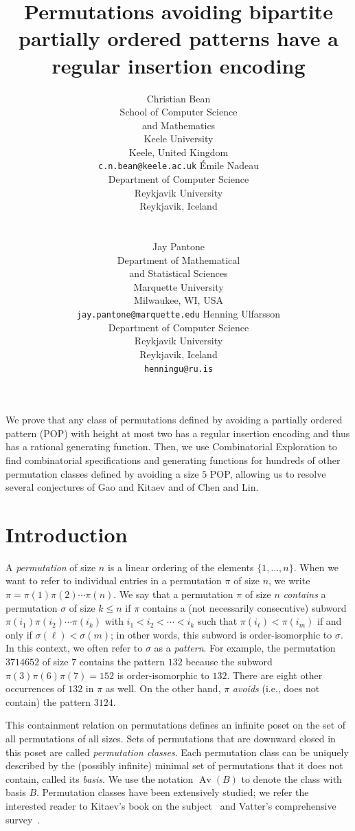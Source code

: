 \documentclass[11pt]{article}
\title{Permutations avoiding bipartite partially ordered patterns have a regular insertion encoding}
\author{
	\begin{tabular}{m{2.5in}m{2.5in}}
		\makecell{
			Christian Bean\\
			\small School of Computer Science\\
			\small and Mathematics\\
			\small Keele University\\
			\small Keele, United Kingdom\\
			\small \texttt{c.n.bean@keele.ac.uk}
		}&
		\makecell{
			\'Emile Nadeau\\
			\small Department of Computer Science\\
			\small Reykjavik University\\
			\small Reykjavik, Iceland\\
		}\\&\\
		\makecell{
			Jay Pantone\\
			\small Department of Mathematical\\
			\small and Statistical Sciences\\
			\small Marquette University\\
			\small Milwaukee, WI, USA\\
			\small \texttt{jay.pantone@marquette.edu}
		}
		&
		\makecell{
			Henning Ulfarsson\\
			\small Department of Computer Science\\
			\small Reykjavik University\\
			\small Reykjavik, Iceland\\
			\small \texttt{henningu@ru.is}
		}
	\end{tabular}
}
\date{}
\theoremstyle{definition}
\numberwithin{theorem}{section}
\numberwithin{question}{section}
\numberwithin{definition}{section}
\numberwithin{example}{section}
\numberwithin{remark}{section}
\newcommand{\Av}{\operatorname{Av}}
\renewenvironment{abstract}{
	\begin{list}{}%
	{\setlength{\rightmargin}{1in}%
	\setlength{\leftmargin}{1in}}%
	\item[]\ignorespaces\begin{small}}%
	{\end{small}\unskip\end{list}%
}
\begin{document}
\maketitle

\begin{abstract}
	We prove that any class of permutations defined by avoiding a partially ordered pattern (POP) with height at most two has a regular insertion encoding and thus has a rational generating function. Then, we use Combinatorial Exploration to find combinatorial specifications and generating functions for hundreds of other permutation classes defined by avoiding a size $5$ POP, allowing us to resolve several conjectures of Gao and Kitaev and of Chen and Lin.
\end{abstract}




\section{Introduction}

A \emph{permutation} of size $n$ is a linear ordering of the elements $\{1, \ldots, n\}$. When we want to refer to individual entries in a permutation $\pi$ of size $n$, we write $\pi = \pi(1)\pi(2)\cdots\pi(n)$. We say that a permutation $\pi$ of size $n$ \emph{contains} a permutation $\sigma$ of size $k \leq n$ if $\pi$ contains a (not necessarily consecutive) subword $\pi(i_1)\pi(i_2)\cdots\pi(i_k)$ with $i_1 < i_2 < \cdots < i_k$ such that $\pi(i_\ell) < \pi(i_m)$ if and only if $\sigma(\ell) < \sigma(m)$; in other words, this subword is order-isomorphic to $\sigma$. In this context, we often refer to $\sigma$ as a \emph{pattern}. For example, the permutation $3714652$ of size $7$ contains the pattern $132$ because the subword $\pi(3)\pi(6)\pi(7) = 152$ is order-isomorphic to $132$. There are eight other occurrences of $132$ in $\pi$ as well. On the other hand, $\pi$ \emph{avoids} (i.e., does not contain) the pattern $3124$.

This containment relation on permutations defines an infinite poset on the set of all permutations of all sizes. Sets of permutations that are downward closed in this poset are called \emph{permutation classes}. Each permutation class can be uniquely described by the (possibly infinite) minimal set of permutations that it does not contain, called its \emph{basis}. We use the notation $\Av(B)$ to denote the class with basis $B$. Permutation classes have been extensively studied; we refer the interested reader to Kitaev's book on the subject~\cite{kitaev:pp-book} and Vatter's comprehensive survey~\cite{vatter:perm-survey}.
\end{document}
